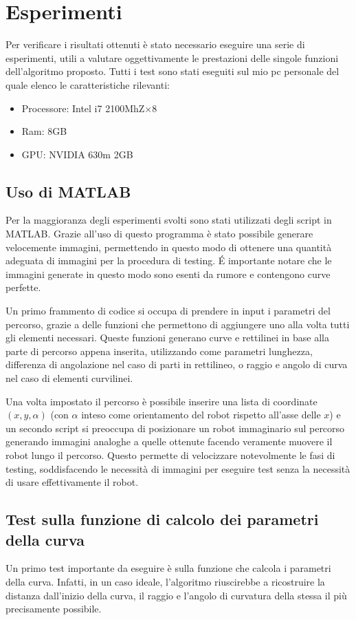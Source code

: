 \chapter{Esperimenti}

    Per verificare i risultati ottenuti è stato necessario eseguire una serie di esperimenti, utili a valutare oggettivamente le prestazioni delle singole funzioni dell'algoritmo proposto.
    Tutti i test sono stati eseguiti sul mio pc personale del quale elenco le caratteristiche rilevanti:
    \begin{itemize}
        \item Processore: Intel i7 2100MhZ$\times$8
        \item Ram: 8GB
        \item GPU: NVIDIA 630m 2GB
    \end{itemize}

\section{Uso di MATLAB}
    Per la maggioranza degli esperimenti svolti sono stati utilizzati degli script in MATLAB. Grazie all'uso di questo programma è stato possibile generare velocemente immagini, permettendo in questo modo di ottenere una quantità adeguata di immagini per la procedura di testing. \'E importante notare che le immagini generate in questo modo sono esenti da rumore e contengono curve perfette.

    Un primo frammento di codice si occupa di prendere in input i parametri del percorso, grazie a delle funzioni che permettono di aggiungere uno alla volta tutti gli elementi necessari. Queste funzioni generano curve e rettilinei in base alla parte di percorso appena inserita, utilizzando come parametri lunghezza, differenza di angolazione nel caso di parti in rettilineo, o raggio e angolo di curva nel caso di elementi curvilinei.

    Una volta impostato il percorso è possibile inserire una lista di coordinate $(x, y, \alpha)$ (con $\alpha$ inteso come orientamento del robot rispetto all'asse delle $x$) e un secondo script si preoccupa di posizionare un robot immaginario sul percorso generando immagini analoghe a quelle ottenute facendo veramente muovere il robot lungo il percorso. Questo permette di velocizzare notevolmente le fasi di testing, soddisfacendo le necessità di immagini per eseguire test senza la necessità di usare effettivamente il robot.

\section{Test sulla funzione di calcolo dei parametri della curva}
    Un primo test importante da eseguire è sulla funzione che calcola i parametri della curva. Infatti, in un caso ideale,  l'algoritmo riuscirebbe a ricostruire la distanza dall'inizio della curva, il raggio e l'angolo di curvatura della stessa il più precisamente possibile.

